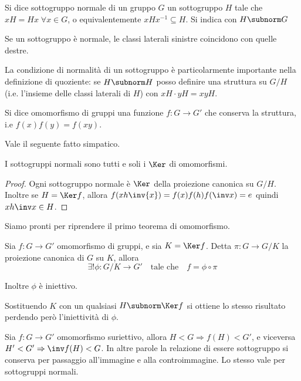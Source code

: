 \documentclass[a4paper,10pt,oneside]{math_article}
\begin{document}
      \begin{mydef}
	Si dice sottogruppo normale di un gruppo $G$ un sottogruppo $H$ tale che $xH=Hx\; \forall x\in G$, o equivalentemente $xHx^{-1}\subseteq H$. Si indica con $H \subnorm G$
      \end{mydef}
      
      Se un sottogruppo è normale, le classi laterali sinistre coincidono con quelle destre.
      
      La condizione di normalità di un sottogruppo è particolarmente importante nella definizione di quoziente: se $H\subnorm H$ posso definire una struttura su $G/H$ (i.e. l'insieme delle classi laterali di $H$) con $xH \cdot yH = xyH$.
      
      \begin{mydef}
	Si dice omomorfismo di gruppi una funzione $f: G \rightarrow G'$ che conserva la struttura, i.e $f(x)f(y)=f(xy)$.
      \end{mydef}
      
      Vale il seguente fatto simpatico.
      
      \begin{myprop}
	I sottogruppi normali sono tutti e soli i $\Ker$ di omomorfismi.
      \end{myprop}
      \begin{proof}
	Ogni sottogruppo normale è $\Ker$ della proiezione canonica su $G/H$. Inoltre se $H = \Ker f$, allora $f(xh\inv{x})= f(x)f(h)f(\inv x)=e$ quindi $xh\inv x\in H$.
      \end{proof}
      
      Siamo pronti per riprendere il primo teorema di omomorfismo.
      \begin{mytheorem}\label{th:Hom1}
	Sia $f: G\rightarrow G'$ omomorfismo di gruppi, e sia $K= \Ker f$. Detta $\pi: G\rightarrow G/K$ la proiezione canonica di $G$ su $K$, allora 
	\[\exists!\phi: G/K \rightarrow G' \quad\mbox{tale che}\quad f=\phi\circ\pi\]
	
	Inoltre $\phi$ è iniettivo.
      \end{mytheorem}
      
      Sostituendo $K$ con un qualsiasi $H\subnorm \Ker f$ si ottiene lo stesso risultato perdendo però l'iniettività di $\phi$.
      
      \begin{myprop}
	Sia $f: G \rightarrow G'$ omomorfismo suriettivo, allora $H<G \Rightarrow f(H)<G'$, e viceversa $H'<G' \Rightarrow \inv f(H)<G$. In altre parole la relazione di essere sottogruppo si conserva per passaggio all'immagine e alla controimmagine. Lo stesso vale per sottogruppi normali.
      \end{myprop}
\end{document}
